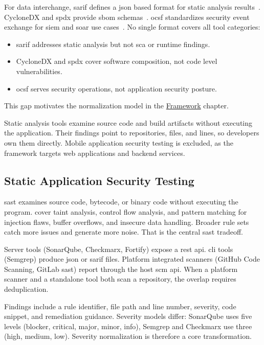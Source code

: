 For data interchange, \gls{sarif} defines a \gls{json} based format for static analysis results~\cite{OASIS2024}. CycloneDX and \gls{spdx} provide \gls{sbom} schemas~\cite{CycloneDX2024, SPDX2024}. \Gls{ocsf} standardizes security event exchange for \gls{siem} and \gls{soar} use cases~\cite{OCSF2024}. No single format covers all tool categories:
\begin{itemize}
    \item \gls{sarif} addresses static analysis but not \gls{sca} or runtime findings.
    \item CycloneDX and \gls{spdx} cover software composition, not code level vulnerabilities.
    \item \gls{ocsf} serves security operations, not application security posture.
\end{itemize}
This gap motivates the normalization model in the \hyperref[ch:framework]{Framework} chapter.

Static analysis tools examine source code and build artifacts without executing the application. Their findings point to repositories, files, and lines, so developers own them directly. Mobile application security testing is excluded, as the framework targets web applications and backend services.


\subsection{Static Application Security Testing}

\Gls{sast} examines source code, bytecode, or binary code without executing the program. \textcite{Chess2007} cover taint analysis, control flow analysis, and pattern matching for injection flaws, buffer overflows, and insecure data handling. Broader rule sets catch more issues and generate more noise. That is the central \gls{sast} tradeoff.

Server tools (SonarQube, Checkmarx, Fortify) expose a \gls{rest} \gls{api}. \gls{cli} tools (Semgrep) produce \gls{json} or \gls{sarif} files. Platform integrated scanners (GitHub Code Scanning, GitLab \gls{sast}) report through the host \gls{scm} \gls{api}. When a platform scanner and a standalone tool both scan a repository, the overlap requires deduplication.

Findings include a rule identifier, file path and line number, severity, code snippet, and remediation guidance. Severity models differ: SonarQube uses five levels (blocker, critical, major, minor, info), Semgrep and Checkmarx use three (high, medium, low). Severity normalization is therefore a core transformation.

